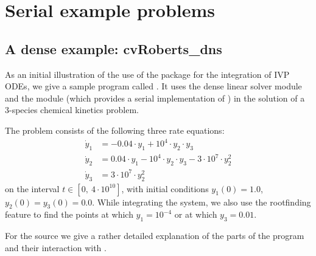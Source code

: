 \section{Serial example problems}\label{s:ex_serial}

\subsection{A dense example: cvRoberts\_dns}\label{ss:cvRoberts}

As an initial illustration of the use of the {\cvode} package for the
integration of IVP ODEs, we give a sample program called .
It uses the {\cvode} dense linear solver module {\cvdense} 
and the {\nvecs} module (which provides a serial implementation of {\nvector})
in the solution of a 3-species chemical kinetics problem.

The problem consists of the following three rate equations:
\vspace*{-.08in}
\begin{equation}
  \begin{split}
    \dot{y}_1 &= -0.04 \cdot y_1 + 10^4 \cdot y_2 \cdot y_3 \\
    \dot{y}_2 &=  0.04 \cdot y_1 - 10^4 \cdot y_2 \cdot y_3
                                  - 3 \cdot 10^7 \cdot y_2^2 \\
    \dot{y}_3 &=  3 \cdot 10^7 \cdot y_2^2
  \end{split} 
\end{equation}
on the interval $t \in [0, ~4 \cdot 10^{10}]$, with initial conditions
$y_1(0) = 1.0$, $y_2(0) = y_3(0) = 0.0$.
While integrating the system, we also use the rootfinding
feature to find the points at which $y_1 = 10^{-4}$ or at which
$y_3 = 0.01$.

For the source we give a rather detailed explanation of the parts of the program and
their interaction with {\cvode}.

